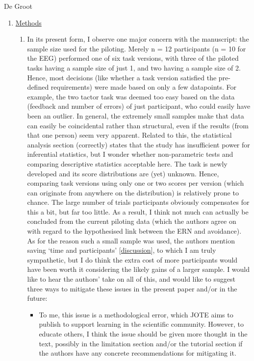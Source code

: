 \documentclass[twocolumn, serif, authordate, review]{jote-article}
\begin{document}
\begin{paracol}{2}
\begin{reviewend}{De Groot}
\begin{enumerate}[label=\textbf{\arabic*}), start=0]
    \item \hyperref[sec:methods]{Methods}
        \begin{enumerate}
            \item In its present form, I observe one major concern with the manuscript: the sample size used for the piloting. Merely n = 12 participants (n = 10 for the EEG) performed one of six task versions, with three of the piloted tasks having a sample size of just 1, and two having a sample size of 2. Hence, most decisions (like whether a task version satisfied the pre-defined requirements) were made based on only a few datapoints. For example, the two tactor task was deemed too easy based on the data (feedback and number of errors) of just participant, who could easily have been an outlier. In general, the extremely small samples make that data can easily be coincidental rather than structural, even if the results (from that one person) seem very apparent. Related to this, the statistical analysis section (correctly) states that the study has insufficient power for inferential statistics, but I wonder whether non-parametric tests and comparing descriptive statistics acceptable here. The task is newly developed and its score distributions are (yet) unknown. Hence, comparing task versions using only one or two scores per version (which can originate from anywhere on the distribution) is relatively prone to chance. The large number of trials participants obviously compensates for this a bit, but far too little. As a result, I think not much can actually be concluded from the current piloting data (which the authors agree on with regard to the hypothesised link between the ERN and avoidance). As for the reason such a small sample was used, the authors mention saving `time and participants' [\hyperref[sec:discussion]{discussion}], to which I am truly sympathetic, but I do think the extra cost of more participants would have been worth it considering the likely gains of a larger sample. I would like to hear the authors' take on all of this, and would like to suggest three ways to mitigate these issues in the present paper and/or in the future:  
            \begin{itemize}
                \item To me, this issue is a methodological error, which JOTE aims to publish to support learning in the scientific community. However, to educate others, I think the issue should be given more thought in the text, possibly in the limitation section and/or the tutorial section if the authors have any concrete recommendations for mitigating it.

\end{itemize}
\end{enumerate}
\end{enumerate}
\end{reviewend}
\end{paracol}
\end{document}
